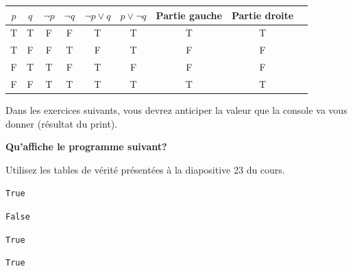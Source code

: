 \begin{Exercice}[7 minutes]
\begin{solution}
    \end{solution}
    \begin{solution}
    \begin{center}
\renewcommand{\arraystretch}{1.2}
\begin{tabular}{|c|c||c|c|c|c||c|c||c|}
\hline
$p$ & $q$ & $\neg p$ & $\neg q$ & $\neg p \vee q$ & $p \vee \neg q$ & Partie gauche & Partie droite \\
\hline
T & T & F & F & T & T & T & T \\
T & F & F & T & F & T & F & F \\
F & T & T & F & T & F & F & F \\
F & F & T & T & T & T & T & T \\
\hline
\end{tabular}
\end{center}
    \end{solution}
    
\end{Exercice}

 Dans les exercices suivants, vous devrez anticiper la valeur que la console va vous donner (résultat du print). \\

    
\begin{Exercice}[5 minutes] \textbf{Qu'affiche le programme suivant?}

    \begin{conseil}
	Utilisez les tables de vérité présentées à la diapositive 23 du cours.
\end{conseil}
    
    

    \begin{solution}
        \texttt{True} 
        
        \texttt{False} 
        
        \texttt{True} 
        
        \texttt{True}
    \end{solution}
    
\end{Exercice}
    
